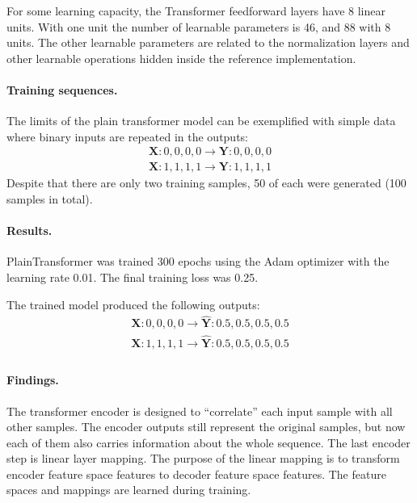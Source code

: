 \documentclass[final]{article}
\begin{document}
For some learning capacity, the Transformer feedforward layers have
8 linear units.
With one unit the number of
learnable parameters is 46, and 88 with 8 units. The other learnable parameters are related to the normalization layers and
other learnable operations hidden inside the reference implementation.

\paragraph{Training sequences.} The limits of the plain transformer model can be exemplified with simple data where binary inputs are repeated in the outputs:
\begin{displaymath}
  \begin{split}
    \mathbf{X}: 0,0,0,0 \rightarrow \mathbf{Y}: 0,0,0,0\\
    \mathbf{X}: 1,1,1,1 \rightarrow \mathbf{Y}: 1,1,1,1
  \end{split}
\end{displaymath}
Despite that there are only two training samples, 50 of each were generated (100 samples in total).

\paragraph{Results.} PlainTransformer was trained 300 epochs using
the Adam optimizer with the learning rate 0.01. The final
training loss was 0.25.

The trained model produced the following outputs:
\begin{displaymath}
  \begin{split}
    \mathbf{X}: 0,0,0,0 \rightarrow \hat{\mathbf{Y}}: 0.5,0.5,0.5,0.5\\
    \mathbf{X}: 1,1,1,1 \rightarrow \hat{\mathbf{Y}}: 0.5,0.5,0.5,0.5\\
  \end{split}
\end{displaymath}

\paragraph{Findings.} The transformer encoder is designed to
``correlate'' each input sample with all other
samples. The encoder outputs still represent the original samples, but now each of them also carries information about the whole sequence. The last encoder step is linear layer mapping. The purpose of the linear mapping is to transform encoder feature space features
to decoder feature space features. The feature spaces and mappings are learned during training.
\end{document}
